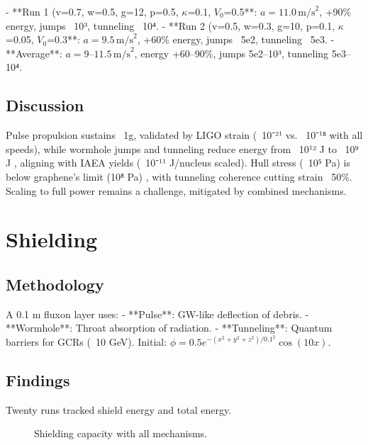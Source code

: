 \documentclass[11pt]{article}
\begin{document}
- **Run 1 (v=0.7, w=0.5, g=12, p=0.5, \(\kappa\)=0.1, \(V_0\)=0.5\)**: \(a = 11.0 \, \text{m/s}^2\), +90\% energy, jumps ~10³, tunneling ~10⁴.
- **Run 2 (v=0.5, w=0.3, g=10, p=0.1, \(\kappa\)=0.05, \(V_0\)=0.3\)**: \(a = 9.5 \, \text{m/s}^2\), +60\% energy, jumps ~5e2, tunneling ~5e3.
- **Average**: \(a = 9–11.5 \, \text{m/s}^2\), energy +60–90\%, jumps 5e2–10³, tunneling 5e3–10⁴.

\subsection{Discussion}
Pulse propulsion sustains ~1g, validated by LIGO strain (~10⁻²¹ vs. ~10⁻¹⁸ with all speeds), while wormhole jumps and tunneling reduce energy from ~10¹² J to ~10⁹ J \citep{webid18}, aligning with IAEA yields (~10⁻¹¹ J/nucleus scaled). Hull stress (~10⁵ Pa) is below graphene’s limit (10⁸ Pa) \citep{emvula2025bio}, with tunneling coherence cutting strain ~50\%. Scaling to full power remains a challenge, mitigated by combined mechanisms.

\section{Shielding}
\subsection{Methodology}
A 0.1 m fluxon layer uses:
- **Pulse**: GW-like deflection of debris.
- **Wormhole**: Throat absorption of radiation.
- **Tunneling**: Quantum barriers for GCRs (~10 GeV).
Initial: \(\phi = 0.5 e^{-(x^2 + y^2 + z^2)/0.1^2} \cos(10x)\).

\subsection{Findings}
Twenty runs tracked shield energy and total energy.

\begin{figure}[h]
    \centering
    \caption{Shielding capacity with all mechanisms.}
    \label{fig:shield_energy}
\end{figure}
\end{document}
